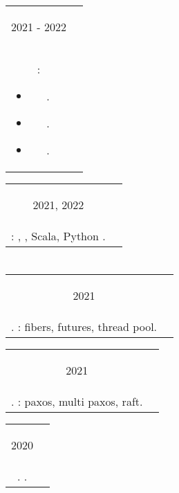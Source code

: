 \documentclass{article}
\newif\ifen
\newif\ifru
\newcommand{\en}[1]{\ifen#1\fi}
\newcommand{\ru}[1]{\ifru#1\fi}
\newcommand{\entry}[3]{
	\begin{tabular}{ c | c }
    \begin{minipage}{0.05\linewidth}
    	\begin{center}
    		#1
    	\end{center}
    \end{minipage} 
    &
    \begin{minipage}{0.85\linewidth}
        \textbf{#2} \\ \footnotesize{#3}
    \end{minipage}
    \end{tabular}
}
\newcommand{\interval}[2]{
	#1 - #2
}
\begin{document}
\entry {\interval{2021}{2022}}
{\ru{Тинькофф}\en{Tinkoff} - \ru{Отдел Кредитных и Брокерских Систем}\en{Credit and Brokerage Systems} - Backend \ru{разработчик}\en{Engineer} - Scala}
{\ru{Разработка и поддержание бэкенда кредитного онлайн брокера на микросервисной архитектуре}\en{Development and maintenance of online credit broker backend on microservice architecture}:
    \begin{itemize}
        \item \ru{Проектирование и реализация бизнес функционала.}\en{Design and implementation of business functionality.}.
        \item \ru{Разработка с применением брокеров сообщений: RabbitMQ и Kafka}\en{Integration of message brokers: RabbitMQ and Kafka}.
        \item \ru{Разработка с применением баз данных: MongoDB и PostgreSQL}\en{Integration of databases: MongoDB and PostgreSQL}.
    \end{itemize}
}

\vspace{.1cm}

\entry {2021, 2022}
{\ru{Летняя Школа Слон в Пущино}\en{Summer School <<Slon>> in Pushchino} - \ru{Волонтер-Преподаватель}\en{Volunteer-Tutor}}
{\ru{Проведение курсов}\en{Courses taught}: \ru{Формальные языки}\en{Formal languages}, \ru{Математическая логика}\en{Mathematical logic}, \ru{ФП в }\en{FP in} Scala, Python \ru{с нуля}\en{from scratch}.
}

\section{\ru{Курсы}}
\entry {2021
}
{\ru{МФТИ}\en{MIPT} - \ru{Теория и практика многопоточной синхронизации}\en{Concurrency course} }
{\ru{Язык C\texttt{++}}\en{C\texttt{++}}. \ru{Реализация библиотеки для работы с многопоточностью}\en{Implementation of simple concurrency library}: fibers, futures, thread pool.  }

\vspace{.1cm}

\entry {2021
}
{\ru{МФТИ}\en{MIPT} - \ru{Распределенные системы}\en{Distributed systems} }
{\ru{Язык C\texttt{++}}\en{C\texttt{++}}. \ru{Реализация алгоритмов распределенных консенсуса и репликации}\en{Implementation of distributed consensus and replication algorithms}: paxos, multi paxos, raft.  }

\vspace{.1cm}

\entry {2020
}
{\ru{Тинькофф.Финтех}\en{Tinkoff.Fintech} - \ru{Курс разработки на Scala}\en{Scala development course} }
{ \ru{Язык Scala}\en{Scala}. \ru{Разработка RESTful сервиса StopLoss-TakeProfit для тинькофф инвестиций}\en{Impementation of StopLoss-TakeProfit service integrated with tinkoff.investments}. }
\end{document}
